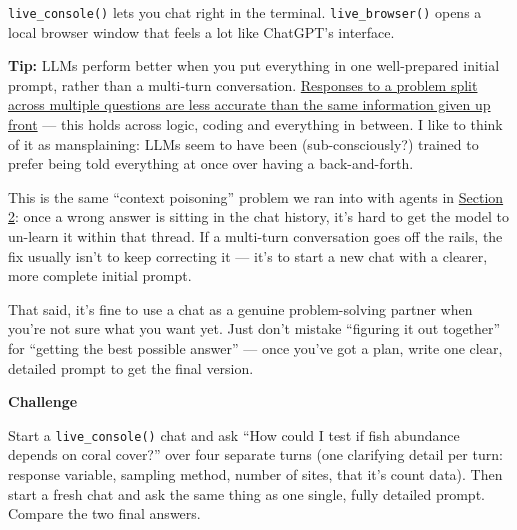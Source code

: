 \documentclass[
  letterpaper,
  DIV=11,
  numbers=noendperiod]{scrreprt}
\begin{document}
\texttt{live\_console()} lets you chat right in the terminal.
\texttt{live\_browser()} opens a local browser window that feels a lot
like ChatGPT's interface.

\textbf{Tip:} LLMs perform better when you put everything in one
well-prepared initial prompt, rather than a multi-turn conversation.
\href{https://arxiv.org/abs/2505.06120}{Responses to a problem split
across multiple questions are less accurate than the same information
given up front} --- this holds across logic, coding and everything in
between. I like to think of it as mansplaining: LLMs seem to have been
(sub-consciously?) trained to prefer being told everything at once over
having a back-and-forth.

This is the same ``context poisoning'' problem we ran into with agents
in \hyperref[when-agents-get-stuck]{Section 2}: once a wrong answer is
sitting in the chat history, it's hard to get the model to un-learn it
within that thread. If a multi-turn conversation goes off the rails, the
fix usually isn't to keep correcting it --- it's to start a new chat
with a clearer, more complete initial prompt.

That said, it's fine to use a chat as a genuine problem-solving partner
when you're not sure what you want yet. Just don't mistake ``figuring it
out together'' for ``getting the best possible answer'' --- once you've
got a plan, write one clear, detailed prompt to get the final version.

\begin{tcolorbox}[enhanced jigsaw, toprule=.15mm, rightrule=.15mm, left=2mm, leftrule=.75mm, breakable, opacityback=0, arc=.35mm, colframe=quarto-callout-important-color-frame, bottomrule=.15mm, colback=white]
\begin{minipage}[t]{5.5mm}
\textcolor{quarto-callout-important-color}{\faExclamation}
\end{minipage}%
\begin{minipage}[t]{\textwidth - 5.5mm}

\vspace{-3mm}\textbf{Challenge}\vspace{3mm}

Start a \texttt{live\_console()} chat and ask ``How could I test if fish
abundance depends on coral cover?'' over four separate turns (one
clarifying detail per turn: response variable, sampling method, number
of sites, that it's count data). Then start a fresh chat and ask the
same thing as one single, fully detailed prompt. Compare the two final
answers.

\end{minipage}%
\end{tcolorbox}
\end{document}
